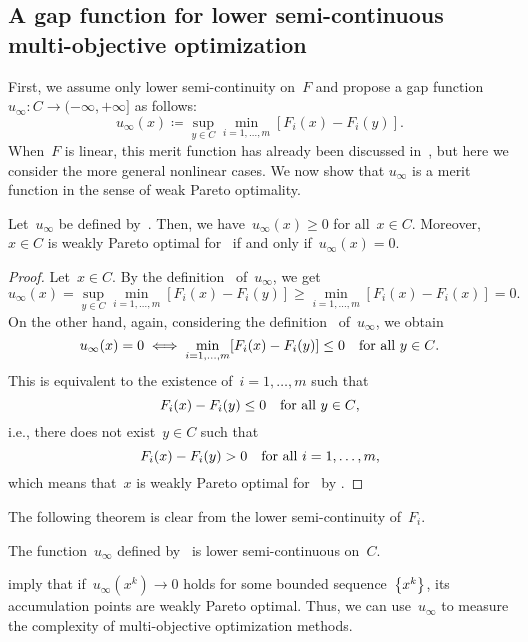 \documentclass[../../main]{subfiles}
\begin{document}
\subsection{A gap function for lower semi-continuous multi-objective optimization} 
First, we assume only lower semi-continuity on~$F$ and propose a gap function~$u_\infty \colon C \to (-\infty, +\infty]$ as follows:
\begin{equation} \label{eq:gap_MO}
    u_\infty(x) \coloneqq \sup_{y \in C} \min_{i = 1, \dots, m} [ F_i(x) - F_i(y) ] 
.\end{equation}
When~$F$ is linear, this merit function has already been discussed in~\cite{Liu2009}, but here we consider the more general nonlinear cases.
We now show that $u_\infty$ is a merit function in the sense of weak Pareto optimality.
\begin{theorem} 
    Let~$u_\infty$ be defined by~.
    Then, we have~$u_\infty(x) \ge 0$ for all~$x \in C$.
    Moreover,~$x \in C$ is weakly Pareto optimal for~ if and only if~$u_\infty(x) = 0$.
\end{theorem}
\begin{proof}
    Let~$x \in C$.
    By the definition~ of~$u_\infty$, we get
    \begin{equation}
        u_\infty(x) = \sup_{y \in C} \min_{i = 1, \dots, m} [ F_i(x) - F_i(y) ]
                 \ge \min_{i = 1, \dots, m} [ F_i(x) - F_i(x) ] = 0
    .\end{equation} 
    On the other hand, again, considering the definition~ of~$u_\infty$, we obtain
    \begin{equation}
        u_\infty(x) = 0 \iff \min_{i = 1, \dots, m} [ F_i(x) - F_i(y) ] \le 0 \forallcondition{y \in C}
    .\end{equation} 
    This is equivalent to the existence of~$i = 1, \dots, m$ such that
    \begin{equation}
        F_i(x) - F_i(y) \le 0 \forallcondition{y \in C}
    ,\end{equation} 
    i.e., there does not exist~$y \in C$ such that
    \begin{equation}
        F_i(x) - F_i(y) > 0 \forallcondition{i = 1, \dots, m}
    ,\end{equation} 
    which means that~$x$ is weakly Pareto optimal for~ by .
\end{proof}

The following theorem is clear from the lower semi-continuity of~$F_i$.
\begin{theorem} 
    The function~$u_\infty$ defined by~ is lower semi-continuous on~$C$.
\end{theorem}
 imply that if~$u_\infty\left(x^k\right) \to 0$ holds for some bounded sequence~$\set*{x^k}$, its accumulation points are weakly Pareto optimal.
Thus, we can use~$u_\infty$ to measure the complexity of multi-objective optimization methods.
\end{document}
